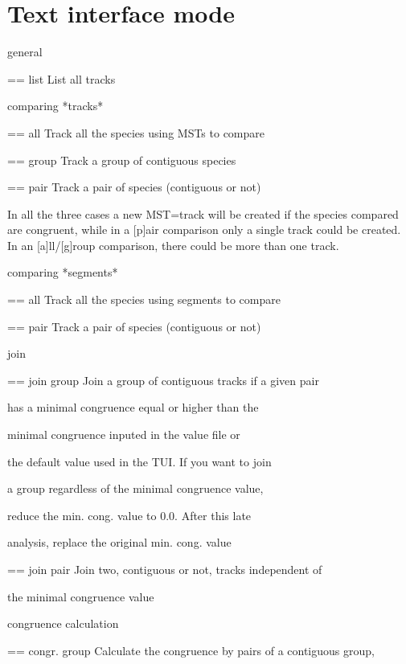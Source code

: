 \label{ch:commands}

\section{Text interface mode}
\label{tui_commands}

	general
	
	 == list			List all tracks
	
	
	comparing *tracks*
		
	 == all			Track all the species using MSTs to compare			
	
	 == group		Track a group of contiguous species
	
	 == pair			Track a pair of species (contiguous or not)
	  
	In all the three cases a new MST=track will be created if the
	species compared are congruent, while in a [p]air comparison
	only a single track could be created. In an [a]ll/[g]roup 
	comparison, there could be more than one track.


	comparing *segments*
		
	 == all			Track all the species using segments to compare			
		
	 == pair			Track a pair of species (contiguous or not)
	  



	join

	
	 == join group	Join a group of contiguous tracks if a given pair 

							has a minimal congruence equal or higher than the

							minimal congruence inputed in the value file or

							the default value used in the TUI. If you want to join

							a group regardless of the minimal congruence value,

							reduce the min. cong. value to 0.0. After this late

							analysis, replace the original min. cong. value
						

	 == join pair		Join two, contiguous or not, tracks independent of

						the minimal congruence value
						

	congruence calculation
	
	 == congr. group	Calculate the congruence by pairs of a contiguous group,

